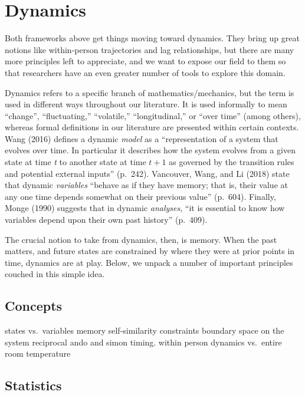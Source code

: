 \documentclass[english,,man]{apa6}
\theoremstyle{definition}
\theoremstyle{definition}
\theoremstyle{definition}
\theoremstyle{remark}
\begin{document}
\hypertarget{dynamics}{%
\section{Dynamics}\label{dynamics}}

Both frameworks above get things moving toward dynamics. They bring up
great notions like within-person trajectories and lag relationships, but
there are many more principles left to appreciate, and we want to expose
our field to them so that researchers have an even greater number of
tools to explore this domain.

Dynamics refers to a specific branch of mathematics/mechanics, but the
term is used in different ways throughout our literature. It is used
informally to mean \enquote{change}, \enquote{fluctuating,}
\enquote{volatile,} \enquote{longitudinal,} or \enquote{over time}
(among others), whereas formal definitions in our literature are
presented within certain contexts. Wang (2016) defines a dynamic
\emph{model} as a \enquote{representation of a system that evolves over
time. In particular it describes how the system evolves from a given
state at time \emph{t} to another state at time \(t + 1\) as governed by
the transition rules and potential external inputs} (p.~242). Vancouver,
Wang, and Li (2018) state that dynamic \emph{variables} \enquote{behave
as if they have memory; that is, their value at any one time depends
somewhat on their previous value} (p.~604). Finally, Monge (1990)
suggests that in dynamic \emph{analyses}, \enquote{it is essential to
know how variables depend upon their own past history} (p.~409).

The crucial notion to take from dynamics, then, is memory. When the past
matters, and future states are constrained by where they were at prior
points in time, dynamics are at play. Below, we unpack a number of
important principles couched in this simple idea.

\hypertarget{concepts}{%
\subsection{Concepts}\label{concepts}}

states vs.~variables memory self-similarity constraints boundary space
on the system reciprocal ando and simon timing. within person dynamics
vs.~entire room temperature

\hypertarget{statistics}{%
\subsection{Statistics}\label{statistics}}
\end{document}
